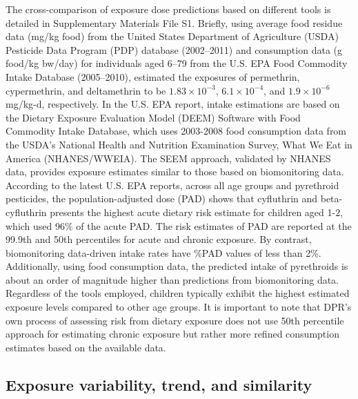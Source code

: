 \documentclass[toxics,article,submit,pdftex,moreauthors]{Definitions/mdpi}
\begin{document}
The cross-comparison of exposure dose predictions based on different
tools is detailed in Supplementary Materials File S1. Briefly, using
average food residue data (mg/kg food) from the United States Department
of Agriculture (USDA) Pesticide Data Program (PDP) database (2002--2011)
and consumption data (g food/kg bw/day) for individuals aged 6--79 from
the U.S. EPA Food Commodity Intake Database (2005--2010),
\citet{aylward_screening_level_2018} estimated the exposures of
permethrin, cypermethrin, and deltamethrin to be
\(1.83 \times 10^{-3}\), \(6.1 \times
10^{-4}\), and \(1.9 \times 10^{-6}\) mg/kg-d, respectively. In the U.S.
EPA report, intake estimations are based on the Dietary Exposure
Evaluation Model (DEEM) Software with Food Commodity Intake Database,
which uses 2003-2008 food consumption data from the USDA's National
Health and Nutrition Examination Survey, What We Eat in America
(NHANES/WWEIA). The SEEM approach, validated by NHANES data, provides
exposure estimates similar to those based on biomonitoring data.
According to the latest U.S. EPA reports, across all age groups and
pyrethroid pesticides, the population-adjusted dose (PAD) shows that
cyfluthrin and beta-cyfluthrin presents the highest acute dietary risk
estimate for children aged 1-2, which used 96\% of the acute PAD. The
risk estimates of PAD are reported at the 99.9th and 50th percentiles
for acute and chronic exposure. By contrast, biomonitoring data-driven
intake rates have \%PAD values of less than 2\%. Additionally, using
food consumption data, the predicted intake of pyrethroids is about an
order of magnitude higher than predictions from biomonitoring data.
Regardless of the tools employed, children typically exhibit the highest
estimated exposure levels compared to other age groups. It is important
to note that DPR's own process of assessing risk from dietary exposure
does not use 50th percentile approach for estimating chronic exposure
but rather more refined consumption estimates based on the available
data.

\subsection{Exposure variability, trend, and
similarity}\label{exposure-variability-trend-and-similarity}
\end{document}
